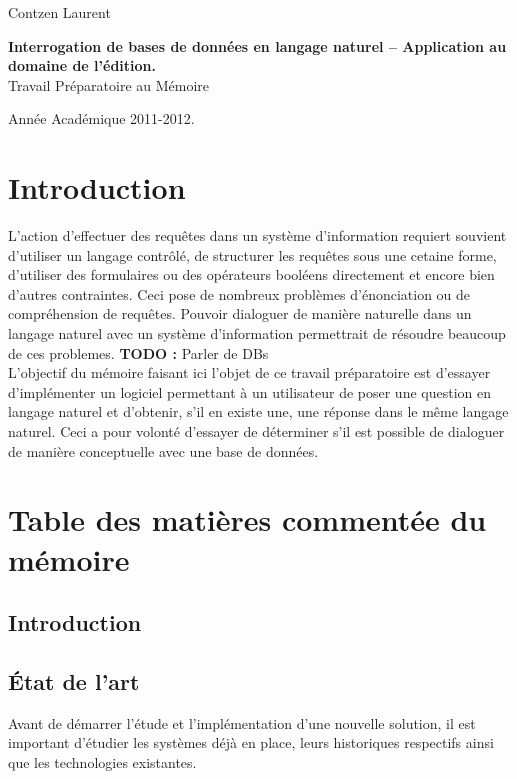 \documentclass[11pt]{article}
\author{Contzen Laurent}
\begin{document}
\begin{titlepage}  
  \begin{flushleft}
    Contzen Laurent
  \end{flushleft}
  \begin{center}
    \vspace{82mm}\LARGE{\textbf{Interrogation de bases de données en langage naturel – Application au domaine de l’édition.} \\    
      Travail Préparatoire au Mémoire}
  \end{center}
  \begin{flushright}
    \vspace{92mm}
    Année Académique 2011-2012.             
  \end{flushright}
\end{titlepage}

\tableofcontents
\newpage

\section{Introduction}
L'action d'effectuer des requêtes dans un système d'information requiert souvient d'utiliser un langage contrôlé, de structurer les requêtes sous une cetaine forme, d'utiliser des formulaires ou des opérateurs booléens directement et encore bien d'autres contraintes. Ceci pose de nombreux problèmes d'énonciation ou de compréhension de requêtes. Pouvoir dialoguer de manière naturelle dans un langage naturel avec un système d'information permettrait de résoudre beaucoup de ces problemes. \colorbox{BrickRed}{\textbf{TODO : } Parler de DBs} \\
L'objectif du mémoire faisant ici l'objet de ce travail préparatoire est d'essayer d'implémenter un logiciel permettant à un utilisateur de poser une question en langage naturel et d'obtenir, s'il en existe une, une réponse dans le même langage naturel. Ceci a pour volonté d'essayer de déterminer s'il est possible de dialoguer de manière conceptuelle avec une base de données.

\section{Table des matières commentée du mémoire}
\subsection{Introduction}
\subsection{État de l'art}
Avant de démarrer l'étude et l'implémentation d'une nouvelle solution, il est important d'étudier les systèmes déjà en place, leurs historiques respectifs ainsi que les technologies existantes.
\end{document}

